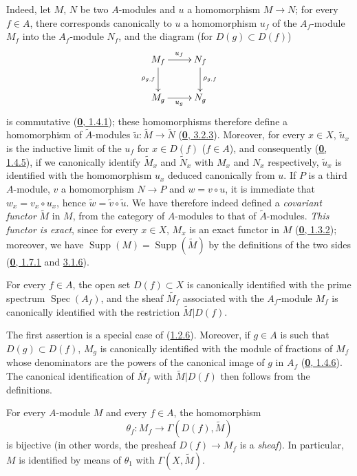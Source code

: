 Indeed, let $M$, $N$ be two $A$-modules and $u$ a homomorphism
$M\to N$; for every $f\in A$, there corresponds canonically to $u$ a
homomorphism $u_f$ of the $A_f$-module $M_f$ into the $A_f$-module $N_f$,
and the diagram (for $D(g)\subset D(f)$)
\[
  \xymatrix{
    M_f\ar[r]^{u_f}\ar[d]_{\rho_{g,f}} & N_f\ar[d]^{\rho_{g,f}}\\
    M_g\ar[r]_{u_g} & N_g
  }
\]
is commutative (\hyperref[0.1.4.1]{\textbf{0}, 1.4.1}); these homomorphisms
therefore define a homomorphism of $\widetilde{A}$-modules
$\widetilde{u}:\widetilde{M}\to\widetilde{N}$
(\hyperref[0.3.2.3]{\textbf{0}, 3.2.3}). Moreover, for every $x\in X$,
$\widetilde{u}_x$ is the inductive limit of the $u_f$ for $x\in D(f)$
($f\in A$), and consequently (\hyperref[0.1.4.5]{\textbf{0}, 1.4.5}), if we
canonically identify $\widetilde{M}_x$ and $\widetilde{N}_x$ with $M_x$ and
$N_x$ respectively, $\widetilde{u}_x$ is identified with the homomorphism
$u_x$ deduced canonically from $u$. If $P$ is a third $A$-module, $v$ a
homomorphism $N\to P$ and $w=v\circ u$, it is immediate that
$w_x=v_x\circ u_x$, hence $\widetilde{w}=\widetilde{v}\circ\widetilde{u}$.
We have therefore indeed defined a \emph{covariant functor} $\widetilde{M}$
in $M$, from the category of $A$-modules to that of $\widetilde{A}$-modules.
\emph{This functor is exact}, since for every $x\in X$, $M_x$ is an exact
functor in $M$ (\hyperref[0.1.3.2]{\textbf{0}, 1.3.2}); moreover, we have
$\operatorname{Supp}(M)=\operatorname{Supp}(\widetilde{M})$ by the
definitions of the two sides (\hyperref[0.1.7.1]{\textbf{0}, 1.7.1} and
\hyperref[0.3.1.6]{3.1.6}).

\begin{proposition}[1.3.6]
\label{I.1.3.6}
For every $f\in A$, the open set $D(f)\subset X$ is canonically identified
with the prime spectrum $\operatorname{Spec}(A_f)$, and the sheaf
$\widetilde{M_f}$ associated with the $A_f$-module $M_f$ is canonically
identified with the restriction $\widetilde{M}|D(f)$.
\end{proposition}

The first assertion is a special case of
(\hyperref[I.1.2.6]{1.2.6}). Moreover, if $g\in A$ is such that
$D(g)\subset D(f)$, $M_g$ is canonically identified with the module of
fractions of $M_f$ whose denominators are the powers of the canonical image
of $g$ in $A_f$ (\hyperref[0.1.4.6]{\textbf{0}, 1.4.6}). The canonical
identification of $\widetilde{M_f}$ with $\widetilde{M}|D(f)$ then follows
from the definitions.

\begin{theorem}[1.3.7]
\label{I.1.3.7}
For every $A$-module $M$ and every $f\in A$, the homomorphism
\[
  \theta_f:M_f\longrightarrow\Gamma(D(f),\widetilde{M})
\]
is bijective \textup{(in other words, the presheaf $D(f)\to M_f$ is a
\emph{sheaf})}. In particular, $M$ is identified by means of $\theta_1$ with
$\Gamma(X,\widetilde{M})$.
\end{theorem}

